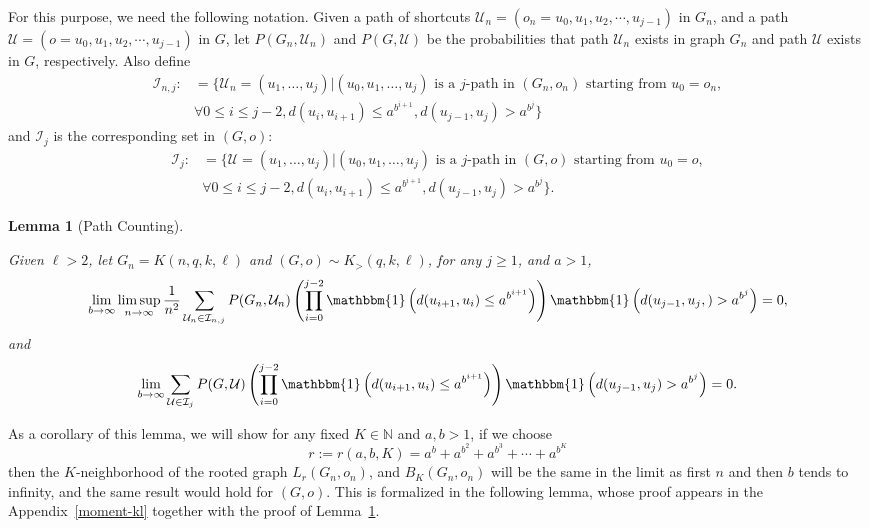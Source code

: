 \documentclass[10pt]{amsart}
\newtheorem{lemma}[theorem]{Lemma}
\begin{document}
For this purpose, we need the following notation. Given a path of shortcuts  $\mathcal{U}_n = (o_n = u_0, u_1, u_2, \cdots, u_{j-1})$ in $G_n$, and  a path $\mathcal{U} = (o = u_0, u_1, u_2, \cdots, u_{j-1})$ in $G$, let $P(G_n, \mathcal{U}_n)$ and $P(G, \mathcal{U})$ be the probabilities that path $\mathcal{U}_n$ exists in graph $G_n$ and path $\mathcal{U}$ exists in $G$, respectively. Also define
\begin{align*}
    \mathcal{I}_{n,j} :&= \{  \mathcal{U}_n =  (u_1, \dots, u_j) | (u_0, u_1, \dots, u_j) \text{ is a } j\text{-path in } (G_n, o_n) \text{ starting from } u_0 = o_n, \\
     &\forall 0\leq i \leq j-2, d(u_i, u_{i+1}) \leq a^{b^{i+1}}, d(u_{j-1}, u_{j}) > a^{b^{j}}\}
\end{align*}
 and $\mathcal{I}_{j}$ is the corresponding set in $(G, o)$:
 \begin{align*}
    \mathcal{I}_{j} :&= \{  \mathcal{U} =  (u_1, \dots, u_j) | (u_0, u_1, \dots, u_j) \text{ is a } j\text{-path in } (G, o) \text{ starting from } u_0 = o, \\
     &\forall 0\leq i \leq j-2, d(u_i, u_{i+1}) \leq a^{b^{i+1}}, d(u_{j-1}, u_{j}) > a^{b^{j}}\}.
\end{align*}

\begin{lemma} [Path Counting] \label{path counting}

Given $\ell>2$, let $G_n=K(n,q,k,\ell)$ and $(G,o)\sim K_>(q,k,\ell)$, for any $j \geq 1$, and $a > 1$,
\begin{align}
\lim_{b \to \infty} \limsup_{n \to \infty} \frac{1}{n^2} \sum_{\mathcal{U}_n \in \mathcal{I}_{n,j}} P(G_n, \mathcal{U}_n) \left( \prod_{i=0}^{j-2} \mathbbm{1} \left( d( u_{i+1}, u_i) \leq a^{b^{i+1}} \right) \right)
\mathbbm{1} \left( d(u_{j-1}, u_j, ) > a^{b^j} \right) = 0,
\end{align}
and
\begin{align} \label{second identity}
\lim_{b \to \infty}   \sum_{\mathcal{U} \in \mathcal{I}_{j}} P(G, \mathcal{U}) \left( \prod_{i=0}^{j-2} \mathbbm{1} \left( d(u_{i+1}, u_i)  \leq a^{b^{i+1}} \right) \right)
\mathbbm{1} \left( d(u_{j-1}, u_j) > a^{b^j} \right) = 0.
\end{align}
\end{lemma}

As a corollary of this lemma, we will show for any fixed $K \in \mathbb{N}$ and $a,b > 1$, if we choose
$$r := r(a,b,K) = a^b + a^{b^2} + a^{b^3} + \cdots + a^{b^K}$$
then the $K$-neighborhood of the rooted graph $L_r(G_n, o_n)$, and  $B_K(G_n, o_n)$ will be the same in the limit as first $n$ and then $b$ tends to infinity, and the same result would hold for $(G, o)$. This is formalized in the following lemma, whose proof appears in the Appendix~\ref{moment-kl} together with the proof of Lemma~\ref{path counting}. 
\end{document}
